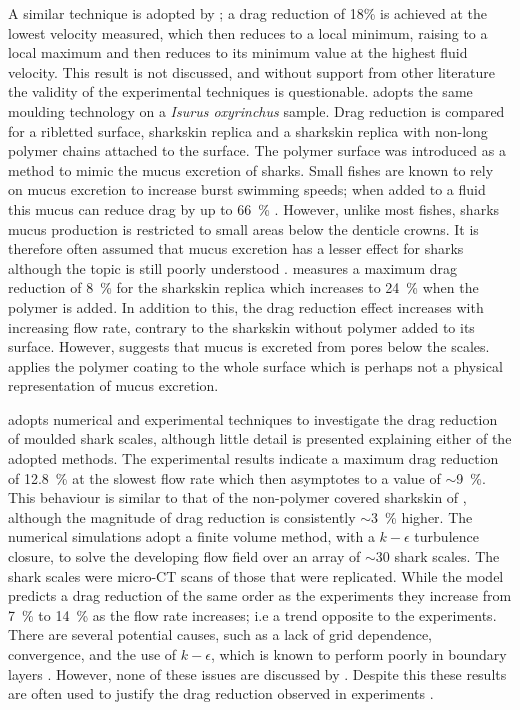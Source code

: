 \documentclass[12pt,oneside,a4paper]{article}
\begin{document}
A similar technique is adopted by \cite{zhao2012}; a drag reduction of 18\% is achieved at the lowest velocity measured, which then reduces to a local minimum, raising to a local maximum and then reduces to its minimum value at the highest fluid velocity. This result is not discussed, and without support from other literature the validity of the experimental techniques is questionable. \cite{zhang2011b} adopts the same moulding technology on a \textit{Isurus oxyrinchus} sample. Drag reduction is compared for a ribletted surface, sharkskin replica and a sharkskin replica with non-long polymer chains attached to the surface. The polymer surface was introduced as a method to mimic the mucus excretion of sharks. Small fishes are known to rely on mucus excretion to increase burst swimming speeds; when added to a fluid this mucus can reduce drag by up to \SI{66}{\%} \citep{fletcher2014phd}. However, unlike most fishes, sharks mucus production is restricted to small areas below the denticle crowns. It is therefore often assumed that mucus excretion has a lesser effect for sharks although the topic is still poorly understood \citep{fletcher2014phd}. %
\cite{zhang2011b} measures a maximum drag reduction of \SI{8}{\%} for the sharkskin replica which increases to \SI{24}{\%} when the polymer is added. In addition to this, the drag reduction effect increases with increasing flow rate, contrary to the sharkskin without polymer added to its surface. However, \cite{fletcher2014phd} suggests that mucus is excreted from pores below the scales. \cite{zhang2011b} applies the polymer coating to the whole surface which is perhaps not a physical representation of mucus excretion. 

\cite{zhang2011a} adopts numerical and experimental techniques to investigate the drag reduction of moulded shark scales, although little detail is presented explaining either of the adopted methods. The experimental results indicate a maximum drag reduction of \SI{12.8}{\%} at the slowest flow rate which then asymptotes to a value of $\sim$\SI{9}{\%}. This behaviour is similar to that of the non-polymer covered sharkskin of \cite{zhang2011b}, although the magnitude of drag reduction is consistently $\sim$\SI{3}{\%} higher. The numerical simulations adopt a finite volume method, with a $k-\epsilon$ turbulence closure, to solve the developing flow field over an array of $\sim$30 shark scales. The shark scales were micro-CT scans of those that were replicated. While the model predicts a drag reduction of the same order as the experiments they increase from \SI{7}{\%} to \SI{14}{\%} as the flow rate increases; i.e a trend opposite to the experiments. There are several potential causes, such as a lack of grid dependence, convergence, and the use of $k-\epsilon$, which is known to perform poorly in boundary layers \citep{pope2001}. However, none of these issues are discussed by \cite{zhang2011a}. Despite this these results are often used to justify the drag reduction observed in experiments \citep{zhao2012,chen2014}.
\end{document}
